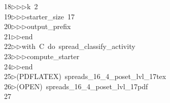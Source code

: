 \begin{tabbing}
18\>$\triangleright$\>$\triangleright$\>$\triangleright$\>k\ 2\ \\[0pt]
19\>$\triangleright$\>$\triangleright$\>$\triangleright$\>starter\_size\ 17\ \\[0pt]
20\>$\triangleright$\>$\triangleright$\>$\triangleright$\>output\_prefix\ \ \\[0pt]
21\>$\triangleright$\>$\triangleright$\>end\ \\[0pt]
22\>$\triangleright$\>$\triangleright$\>with\ C\ do\ spread\_classify\_activity\ \\[0pt]
23\>$\triangleright$\>$\triangleright$\>$\triangleright$\>compute\_starter\ \\[0pt]
24\>$\triangleright$\>$\triangleright$\>end\\[0pt]
25\>$\triangleright$\>(PDFLATEX)\ spreads\_16\_4\_poset\_lvl\_17tex\\[0pt]
26\>$\triangleright$\>(OPEN)\ spreads\_16\_4\_poset\_lvl\_17pdf\\[0pt]
27\>\end{tabbing}
